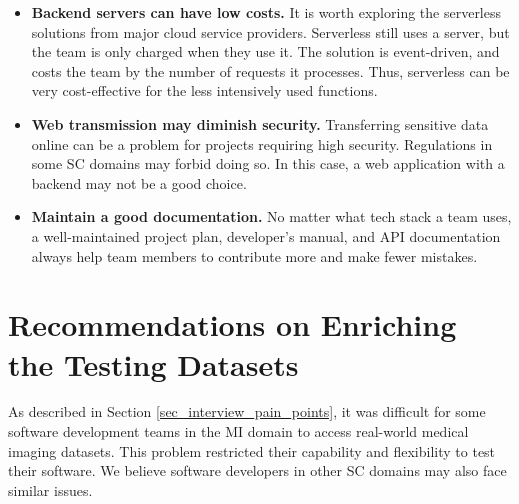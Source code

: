 \begin{itemize}
\item \textbf{Backend servers can have low costs.} It is worth exploring the serverless solutions from major cloud service providers. Serverless still uses a server, but the team is only charged when they use it. The solution is event-driven, and costs the team by the number of requests it processes. Thus, serverless can be very cost-effective for the less intensively used functions.

\item \textbf{Web transmission may diminish security.} Transferring sensitive data online can be a problem for projects requiring high security. Regulations in some SC domains may forbid doing so. In this case, a web application with a backend may not be a good choice.

\item \textbf{Maintain a good documentation.} No matter what tech stack a team uses, a well-maintained project plan, developer's manual, and API documentation always help team members to contribute more and make fewer mistakes.
\end{itemize}

\section{Recommendations on Enriching the Testing Datasets}
\label{sec_recommendations_testing_dataset}

As described in Section \ref{sec_interview_pain_points}, it was difficult for some software development teams in the MI domain to access real-world medical imaging datasets. This problem restricted their capability and flexibility to test their software. We believe software developers in other SC domains may also face similar issues.

